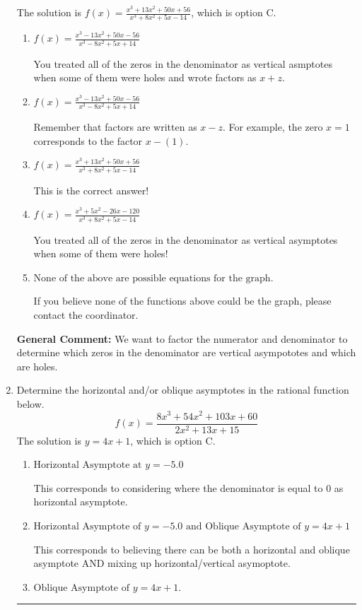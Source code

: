 \documentclass{extbook}[14pt]
\newcommand{\litem}[1]{\item #1

\rule{\textwidth}{0.4pt}}
\begin{document}
\begin{enumerate}
{The solution is \( f(x)=\frac{x^{3} +13 x^{2} +50 x + 56}{x^{3} +8 x^{2} +5 x -14} \), which is option C.\begin{enumerate}[label=\Alph*.]
\item \( f(x)=\frac{x^{3} -13 x^{2} +50 x -56}{x^{3} -8 x^{2} +5 x + 14} \)

You treated all of the zeros in the denominator as vertical asmptotes when some of them were holes and wrote factors as $x+z$.
\item \( f(x)=\frac{x^{3} -13 x^{2} +50 x -56}{x^{3} -8 x^{2} +5 x + 14} \)

Remember that factors are written as $x-z$. For example, the zero $x=1$ corresponds to the factor $x-(1)$.
\item \( f(x)=\frac{x^{3} +13 x^{2} +50 x + 56}{x^{3} +8 x^{2} +5 x -14} \)

This is the correct answer!
\item \( f(x)=\frac{x^{3} +5 x^{2} -26 x -120}{x^{3} +8 x^{2} +5 x -14} \)

You treated all of the zeros in the denominator as vertical asymptotes when some of them were holes!
\item \( \text{None of the above are possible equations for the graph.} \)

If you believe none of the functions above could be the graph, please contact the coordinator.
\end{enumerate}

\textbf{General Comment:} We want to factor the numerator and denominator to determine which zeros in the denominator are vertical asympototes and which are holes.
}
\litem{
Determine the horizontal and/or oblique asymptotes in the rational function below.
\[ f(x) = \frac{8x^{3} +54 x^{2} +103 x + 60}{2x^{2} +13 x + 15} \]The solution is \( y = 4x + 1 \), which is option C.\begin{enumerate}[label=\Alph*.]
\item \( \text{Horizontal Asymptote at } y = -5.0 \)

This corresponds to considering where the denominator is equal to 0 as horizontal asymptote.
\item \( \text{Horizontal Asymptote of } y = -5.0 \text{ and Oblique Asymptote of } y = 4x + 1 \)

This corresponds to believing there can be both a horizontal and oblique asymptote AND mixing up horizontal/vertical asymoptote.
\item \( \text{Oblique Asymptote of } y = 4x + 1. \)


\end{enumerate}}
\end{enumerate}
\end{document}
